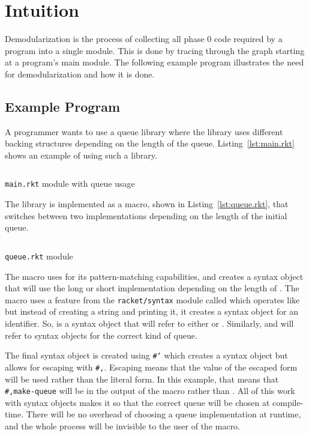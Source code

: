 \chapter{Intuition}
\label{chap:intuition}
Demodularization is the process of collecting all phase 0 code required by a program into a single module.
This is done by tracing through the  graph starting at a program's main module.
The following example program illustrates the need for demodularization and how it is done.

\section{Example Program}
A programmer wants to use a queue library where the library uses different backing structures depending on the length of the queue. 
Listing~\ref{lst:main.rkt} shows an example of using such a library.
\begin{listing}[tb]
  \inputminted{racket}{listings/main.rkt}
  \caption{\texttt{main.rkt} module with queue usage}
  \label{lst:main.rkt}
\end{listing}
The library is implemented as a macro, shown in Listing~\ref{lst:queue.rkt}, that switches between two implementations depending on the length of the initial queue.

\begin{listing}[tb]
  \inputminted{racket}{listings/queue.rkt}
  \caption{\texttt{queue.rkt} module}
  \label{lst:queue.rkt}
\end{listing}

The macro  uses  for its pattern-matching capabilities, and creates a syntax object that will use the long or short implementation depending on the length of . 
The macro uses a feature from the \texttt{racket/syntax} module called  which operates like  but instead of creating a string and printing it, it creates a syntax object for an identifier. 
So,  is a syntax object that will refer to either  or .
Similarly,  and  will refer to syntax objects for the correct kind of queue.

The final syntax object is created using \texttt{#`} which creates a syntax object but allows for escaping with \texttt{#,}. 
Escaping means that the value of the escaped form will be used rather than the literal form. 
In this example, that means that \texttt{#,make-queue} will be  in the output of the macro rather than .
All of this work with syntax objects makes it so that the correct queue will be chosen at compile-time.
There will be no overhead of choosing a queue implementation at runtime, and the whole process will be invisible to the user of the  macro.

